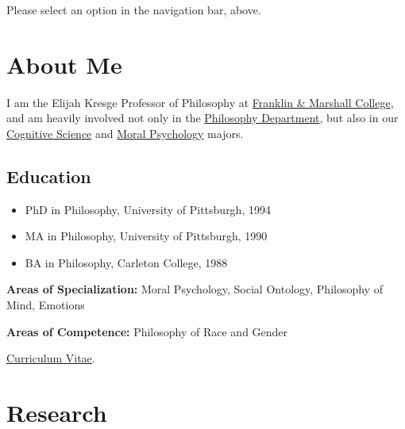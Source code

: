 \documentclass[%
  11pt,%
]{article}
\begin{document}

\tableofcontents

\ifdefined\HCode

  Please select an option in the navigation bar, above.
\else
\fi

\section{About Me}

I am the Elijah Kresge Professor of Philosophy at \href{www.fandm.edu}{Franklin \& Marshall College}, and am heavily involved not only in the \href{https://www.fandm.edu/fields-of-study/philosophy/index.html}{Philosophy Department}, but also in our \href{https://www.fandm.edu/fields-of-study/cognitive-science/index.html}{Cognitive Science} and \href{https://www.fandm.edu/fields-of-study/moral-psychology/index.html}{Moral Psychology} majors.

\subsection{Education}

\begin{itemize}
  \item PhD in Philosophy, University of Pittsburgh, 1994
  \item MA in Philosophy, University of Pittsburgh, 1990
  \item BA in Philosophy, Carleton College, 1988
\end{itemize}

\noindent\textbf{Areas of Specialization:} Moral Psychology, Social Ontology, Philosophy of Mind, Emotions

\noindent\textbf{Areas of Competence:} Philosophy of Race and Gender

\noindent\href{https://drive.google.com/file/d/1-8fjo2F9EzgfDyYo_WSTYhaU-xrDNU8P/view}{Curriculum Vitae}.

\section{Research}
\end{document}
